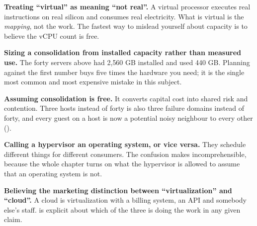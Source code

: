 \begin{pitfall}
\begin{tight}
  \item \textbf{Treating ``virtual'' as meaning ``not real''.} A virtual
        processor executes real instructions on real silicon and consumes real
        electricity. What is virtual is the \emph{mapping}, not the work. The
        fastest way to mislead yourself about capacity is to believe the vCPU
        count is free.
  \item \textbf{Sizing a consolidation from installed capacity rather than
        measured use.} The forty servers above had 2{,}560 GB installed and used
        440 GB. Planning against the first number buys five times the hardware
        you need; it is the single most common and most expensive mistake in
        this subject.
  \item \textbf{Assuming consolidation is free.} It converts capital cost into
        shared risk and contention. Three hosts instead of forty is also three
        failure domains instead of forty, and every guest on a host is now a
        potential noisy neighbour to every other ().
  \item \textbf{Calling a hypervisor an operating system, or vice versa.} They
        schedule different things for different consumers. The confusion makes
         incomprehensible, because the whole chapter turns on what
        the hypervisor is allowed to assume that an operating system is not.
  \item \textbf{Believing the marketing distinction between ``virtualization''
        and ``cloud''.} A cloud is virtualization with a billing system, an API
        and somebody else's staff.  is explicit about which of the
        three is doing the work in any given claim.
\end{tight}
\end{pitfall}

